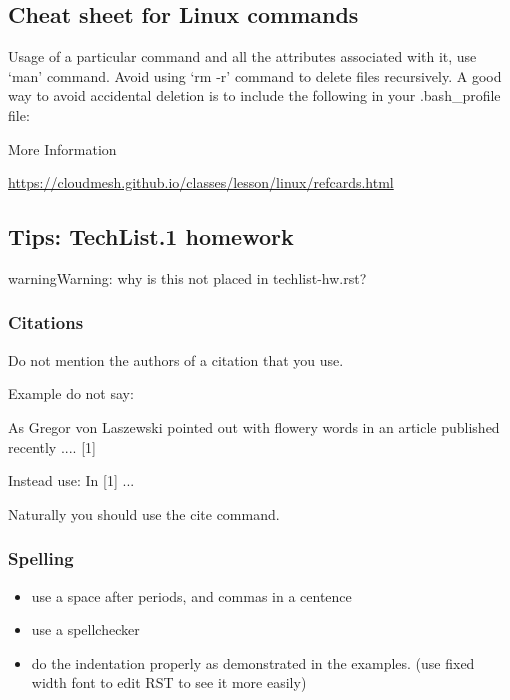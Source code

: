 \subsection{Cheat sheet for Linux commands}
\label{\detokenize{faq:cheat-sheet-for-linux-commands}}
Usage of a particular command and all the attributes associated with
it, use `man' command. Avoid using `rm -r' command to delete files
recursively. A good way to avoid accidental deletion is to include the
following in your .bash\_profile file:

\begin{sphinxVerbatim}[commandchars=\\\{\}]
 
 
 
 
\end{sphinxVerbatim}

More Information

\url{https://cloudmesh.github.io/classes/lesson/linux/refcards.html}


\subsection{Tips: TechList.1 homework}
\label{\detokenize{faq:tips-techlist-1-homework}}
\begin{sphinxadmonition}{warning}{Warning:}
why is this not placed in techlist-hw.rst?
\end{sphinxadmonition}


\subsubsection{Citations}
\label{\detokenize{faq:citations}}
Do not mention the authors of a citation that you use.

Example do not say:

As Gregor von Laszewski pointed out with flowery words in an article published recently .... {[}1{]}

Instead use: In {[}1{]} ...

Naturally you should use the cite command.


\subsubsection{Spelling}
\label{\detokenize{faq:spelling}}\begin{itemize}
\item {} 
use a space after periods, and commas in a centence

\item {} 
use a spellchecker

\item {} 
do the indentation properly as demonstrated in the examples. (use
fixed width font to edit RST to see it more easily)

\end{itemize}


